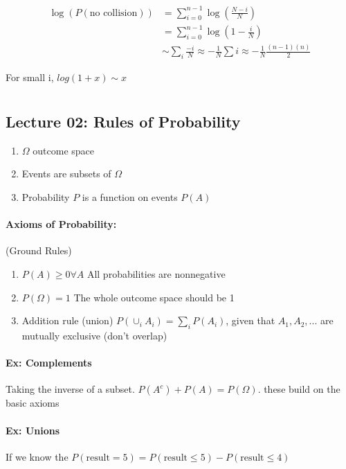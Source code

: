 \documentclass{report}
\begin{document}
\begin{align*}
    \log(P(\text{no collision})) & = \sum_{i=0}^{n-1} \log (\frac{N-i}{N})\\ 
    & = \sum_{i=0}^{n-1} \log (1- \frac{i}{N})\\
    & \sim \sum_ i \frac{-i}N \approx - \frac{1}N \sum i\approx -\frac{1}{N} \frac{(n-1)(n)} {2}
\end{align*}

For small i, $log (1 + x) \sim x$

\chapter{}
\section{Lecture 02: Rules of Probability} 

\begin{enumerate}
    \item $\Omega$ outcome space
    \item Events are subsets of $\Omega$
    \item Probability $P$ is a function on events $P(A)$
\end{enumerate}

\subsubsection{Axioms of Probability:} (Ground Rules) 
\begin{enumerate}
    \item $P(A) \geq 0 \forall A$ All probabilities are nonnegative
    \item $P(\Omega) = 1$ The whole outcome space should be 1 
    \item Addition rule (union) $P(\cup_i A_i) = \sum _i P(A_i)$, given that $A_1, A_2, ...$ are mutually exclusive (don't overlap)
\end{enumerate}



\subsubsection{Ex: Complements}
Taking the inverse of a subset. $P(A^c) + P(A)= P(\Omega)$. these build on the basic axioms 


\subsubsection{Ex: Unions} If we know the $P(\text{result} = 5) = P(\text{result} \leq 5) - P(\text{result} \leq 4)$
\end{document}
